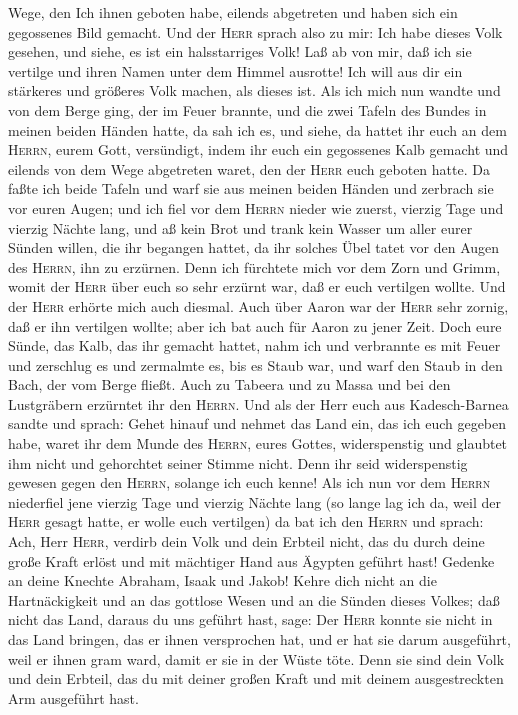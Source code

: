 Wege, den Ich ihnen geboten habe, eilends abgetreten und haben sich ein
gegossenes Bild gemacht.  Und der \textsc{Herr} sprach
also zu mir: Ich habe dieses Volk gesehen, und siehe, es ist ein
halsstarriges Volk!  Laß ab von mir, daß ich sie vertilge
und ihren Namen unter dem Himmel ausrotte! Ich will aus dir ein
stärkeres und größeres Volk machen, als dieses ist.  Als
ich mich nun wandte und von dem Berge ging, der im Feuer brannte, und
die zwei Tafeln des Bundes in meinen beiden Händen hatte,
 da sah ich es, und siehe, da hattet ihr euch an dem
\textsc{Herrn}, eurem Gott, versündigt, indem ihr euch ein gegossenes
Kalb gemacht und eilends von dem Wege abgetreten waret, den der
\textsc{Herr} euch geboten hatte.  Da faßte ich beide
Tafeln und warf sie aus meinen beiden Händen und zerbrach sie vor euren
Augen;  und ich fiel vor dem \textsc{Herrn} nieder wie
zuerst, vierzig Tage und vierzig Nächte lang, und aß kein Brot und trank
kein Wasser um aller eurer Sünden willen, die ihr begangen hattet, da
ihr solches Übel tatet vor den Augen des \textsc{Herrn}, ihn zu
erzürnen.  Denn ich fürchtete mich vor dem Zorn und
Grimm, womit der \textsc{Herr} über euch so sehr erzürnt war, daß er
euch vertilgen wollte. Und der \textsc{Herr} erhörte mich auch diesmal.
 Auch über Aaron war der \textsc{Herr} sehr zornig, daß
er ihn vertilgen wollte; aber ich bat auch für Aaron zu jener Zeit.
 Doch eure Sünde, das Kalb, das ihr gemacht hattet, nahm
ich und verbrannte es mit Feuer und zerschlug es und zermalmte es, bis
es Staub war, und warf den Staub in den Bach, der vom Berge fließt.
 Auch zu Tabeera und zu Massa und bei den Lustgräbern
erzürntet ihr den \textsc{Herrn}.  Und als der Herr euch
aus Kadesch-Barnea sandte und sprach: Gehet hinauf und nehmet das Land
ein, das ich euch gegeben habe, waret ihr dem Munde des \textsc{Herrn},
eures Gottes, widerspenstig und glaubtet ihm nicht und gehorchtet seiner
Stimme nicht.  Denn ihr seid widerspenstig gewesen gegen
den \textsc{Herrn}, solange ich euch kenne!  Als ich nun
vor dem \textsc{Herrn} niederfiel jene vierzig Tage und vierzig Nächte
lang (so lange lag ich da, weil der \textsc{Herr} gesagt hatte, er wolle
euch vertilgen)  da bat ich den \textsc{Herrn} und
sprach: Ach, Herr \textsc{Herr}, verdirb dein Volk und dein Erbteil
nicht, das du durch deine große Kraft erlöst und mit mächtiger Hand aus
Ägypten geführt hast!  Gedenke an deine Knechte Abraham,
Isaak und Jakob! Kehre dich nicht an die Hartnäckigkeit und an das
gottlose Wesen und an die Sünden dieses Volkes;  daß
nicht das Land, daraus du uns geführt hast, sage: Der \textsc{Herr}
konnte sie nicht in das Land bringen, das er ihnen versprochen hat, und
er hat sie darum ausgeführt, weil er ihnen gram ward, damit er sie in
der Wüste töte.  Denn sie sind dein Volk und dein
Erbteil, das du mit deiner großen Kraft und mit deinem ausgestreckten
Arm ausgeführt hast.

